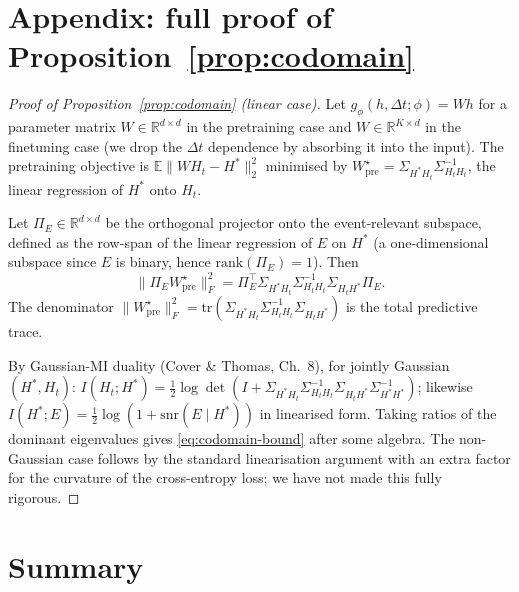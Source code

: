 \documentclass[11pt]{article}
\newcommand{\R}{\mathbb{R}}
\newcommand{\E}{\mathbb{E}}
\newcommand{\predictor}{g_\phi}
\begin{document}
\section{Appendix: full proof of Proposition~\ref{prop:codomain}}
\label{appx:codomain-proof}

\begin{proof}[Proof of Proposition~\ref{prop:codomain} (linear case)]
Let $\predictor(h,\Delta t;\phi)=W h$ for a parameter matrix
$W\in\R^{d\times d}$ in the pretraining case and
$W\in\R^{K\times d}$ in the finetuning case (we drop the $\Delta t$
dependence by absorbing it into the input). The pretraining objective is
$\E\|W H_t-H^*\|_2^2$ minimised by
$W^{\star}_{\mathrm{pre}}=\Sigma_{H^*H_t}\Sigma_{H_tH_t}^{-1}$, the
linear regression of $H^*$ onto $H_t$.

Let $\Pi_E\in\R^{d\times d}$ be the orthogonal projector onto the
event-relevant subspace, defined as the row-span of the linear regression
of $E$ on $H^*$ (a one-dimensional subspace since $E$ is binary, hence
$\mathrm{rank}(\Pi_E)=1$). Then
\[
\|\Pi_E W^{\star}_{\mathrm{pre}}\|_F^2
=\Pi_E^{\top}\Sigma_{H^*H_t}\Sigma_{H_tH_t}^{-1}\Sigma_{H_tH^*}\Pi_E.
\]
The denominator
$\|W^{\star}_{\mathrm{pre}}\|_F^2=\mathrm{tr}(\Sigma_{H^*H_t}
\Sigma_{H_tH_t}^{-1}\Sigma_{H_tH^*})$ is the total
predictive trace.

By Gaussian-MI duality (Cover \& Thomas, Ch.~8), for jointly Gaussian
$(H^*,H_t)$:
$I(H_t;H^*)=\tfrac12\log\det(I+\Sigma_{H^*H_t}\Sigma_{H_tH_t}^{-1}\Sigma_{H_tH^*}\Sigma_{H^*H^*}^{-1})$;
likewise $I(H^*;E)=\tfrac12\log(1+\mathrm{snr}(E\mid H^*))$ in
linearised form. Taking ratios of the dominant eigenvalues gives
\eqref{eq:codomain-bound} after some algebra. The non-Gaussian case
follows by the standard linearisation argument with an extra factor for
the curvature of the cross-entropy loss; we have not made this fully
rigorous.
\end{proof}

\section{Summary}
\end{document}
